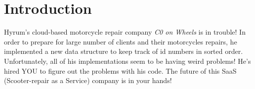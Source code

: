 \section*{Introduction}

Hyrum's cloud-based motorcycle repair company \emph{C0 on Wheels} is
in trouble! In order to prepare for large number of clients and their
motorcycles repairs, he implemented a new data structure to keep track
of id numbers in sorted order. Unfortunately, all of his
implementations seem to be having weird problems! He's hired YOU to
figure out the problems with his code.  The future of this
SaaS (Scooter-repair as a Service) company is in your hands!
